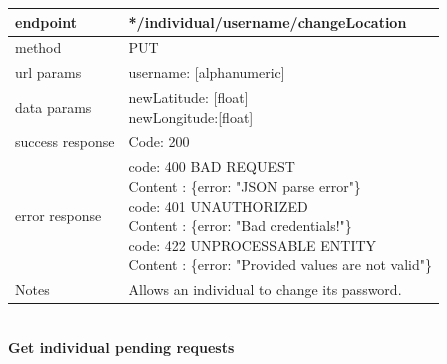 \begin{legal}
\begin{legal}
\begin{itemize}
							\begin{tabularx}{\linewidth}{| l| l }
								\hline
								endpoint & */individual/{username}/changeLocation \\
								\hline
								method & PUT \\
								\hline
								url params & 
								\parbox{0.7\textwidth}{
									\bigskip
									username: [alphanumeric]
									\bigskip
								}\\
								\hline
								data params & 
								\parbox{0.7\textwidth}{
									\bigskip
									newLatitude: [float]\\
									newLongitude:[float]
									\bigskip
								} \\
								\hline
								success response &
								\parbox{0.7\textwidth}{
									\bigskip
									Code: 200
									\bigskip
								} \\
								\hline
								error response &
								\parbox{0.7\textwidth}{
									\bigskip
									code: 400 BAD REQUEST \\
									Content : \{error: "JSON parse error"\}\\
									code: 401 UNAUTHORIZED \\
									Content : \{error: "Bad credentials!"\}\\
									code: 422 UNPROCESSABLE ENTITY\\
									Content : \{error: "Provided values are not valid"\}
									\bigskip
								} \\
								\hline
								Notes & \parbox{0.7\textwidth}{
									\bigskip
									Allows an individual to change its password.
									\bigskip
								} \\
								\hline
							\end{tabularx}\\
							
							\textbf{Get individual pending requests} \\
			

\end{itemize}
\end{legal}
\end{legal}
